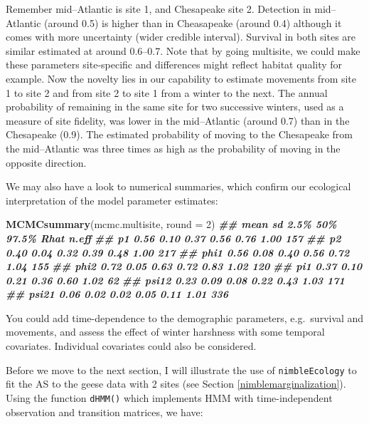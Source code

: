 \documentclass[
  12pt,
]{krantz}
\newenvironment{Shaded}{\begin{snugshade}}{\end{snugshade}}
\newcommand{\AttributeTok}[1]{\textcolor[rgb]{0.13,0.29,0.53}{#1}}
\newcommand{\DecValTok}[1]{\textcolor[rgb]{0.00,0.00,0.81}{#1}}
\newcommand{\DocumentationTok}[1]{\textcolor[rgb]{0.56,0.35,0.01}{\textbf{\textit{#1}}}}
\newcommand{\FunctionTok}[1]{\textcolor[rgb]{0.13,0.29,0.53}{\textbf{#1}}}
\newcommand{\NormalTok}[1]{#1}
\begin{document}
Remember mid--Atlantic is site 1, and Chesapeake site 2. Detection in mid--Atlantic (around 0.5) is higher than in Cheasapeake (around 0.4) although it comes with more uncertainty (wider credible interval). Survival in both sites are similar estimated at around 0.6--0.7. Note that by going multisite, we could make these parameters site-specific and differences might reflect habitat quality for example. Now the novelty lies in our capability to estimate movements from site 1 to site 2 and from site 2 to site 1 from a winter to the next. The annual probability of remaining in the same site for two successive winters, used as a measure of site fidelity, was lower in the mid--Atlantic (around 0.7) than in the Chesapeake (0.9). The estimated probability of moving to the Chesapeake from the mid--Atlantic was three times as high as the probability of moving in the opposite direction.

We may also have a look to numerical summaries, which confirm our ecological interpretation of the model parameter estimates:

\begin{Shaded}
\begin{Highlighting}[]
\FunctionTok{MCMCsummary}\NormalTok{(mcmc.multisite, }\AttributeTok{round =} \DecValTok{2}\NormalTok{)}
\DocumentationTok{\#\#       mean   sd 2.5\%  50\% 97.5\% Rhat n.eff}
\DocumentationTok{\#\# p1    0.56 0.10 0.37 0.56  0.76 1.00   157}
\DocumentationTok{\#\# p2    0.40 0.04 0.32 0.39  0.48 1.00   217}
\DocumentationTok{\#\# phi1  0.56 0.08 0.40 0.56  0.72 1.04   155}
\DocumentationTok{\#\# phi2  0.72 0.05 0.63 0.72  0.83 1.02   120}
\DocumentationTok{\#\# pi1   0.37 0.10 0.21 0.36  0.60 1.02    62}
\DocumentationTok{\#\# psi12 0.23 0.09 0.08 0.22  0.43 1.03   171}
\DocumentationTok{\#\# psi21 0.06 0.02 0.02 0.05  0.11 1.01   336}
\end{Highlighting}
\end{Shaded}

You could add time-dependence to the demographic parameters, e.g.~survival and movements, and assess the effect of winter harshness with some temporal covariates. Individual covariates could also be considered.

Before we move to the next section, I will illustrate the use of \texttt{nimbleEcology} to fit the AS to the geese data with 2 sites (see Section \ref{nimblemarginalization}). Using the function \texttt{dHMM()} which implements HMM with time-independent observation and transition matrices, we have:
\end{document}
